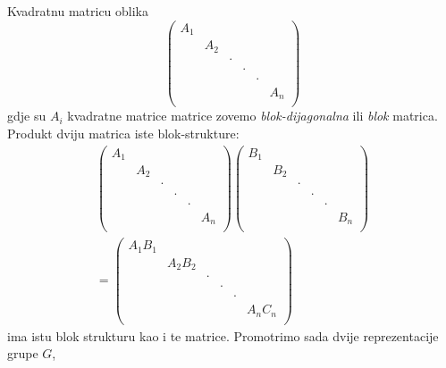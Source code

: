 Kvadratnu matricu oblika
\begin{displaymath}
   \begin{pmatrix}
        A_1 & & & & & \\
        & A_2 & & & &  \\
        & & \cdot & & & \\
        & & &  \cdot  & & \\
        & & & &  \cdot   & \\
        & & & &  & A_n  \\
   \end{pmatrix}
\end{displaymath}
gdje su $A_i$ kvadratne matrice matrice
zovemo \emph{blok-dijagonalna} ili \emph{blok} matrica.
Produkt dviju matrica iste blok-strukture:
\begin{multline*}
   \begin{pmatrix}
        A_1 & & & & & \\
        & A_2 & & & &  \\
        & & \cdot & & & \\
        & & &  \cdot  & & \\
        & & & &  \cdot   & \\
        & & & &  & A_n  \\
\end{pmatrix}
   \begin{pmatrix}
        B_1 & & & & & \\
        & B_2 & & & &  \\
        & & \cdot & & & \\
        & & &  \cdot  & & \\
        & & & &  \cdot   & \\
        & & & &  & B_n  \\
\end{pmatrix}
  \\[2ex]
   = \begin{pmatrix}
        A_1 B_1 & & & & & \\
        & A_2 B_2 & & & &  \\
        & & \cdot & & & \\
        & & &  \cdot  & & \\
        & & & &  \cdot   & \\
        & & & &  & A_n C_n  \\
\end{pmatrix}
\end{multline*}
ima istu blok strukturu kao i te matrice.
Promotrimo sada dvije reprezentacije grupe $G$,
